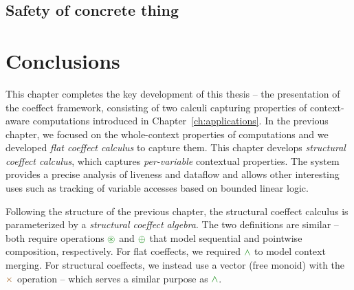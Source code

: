 
\subsection{Safety of concrete thing}
\label{sec:struct-transl-safety}

\newpage


%
%


\section{Conclusions}

This chapter completes the key development of this thesis -- the presentation of the coeffect
framework, consisting of two calculi capturing properties of context-aware computations introduced
in Chapter~\ref{ch:applications}. In the previous chapter, we focused on the whole-context
properties of computations and we developed \emph{flat coeffect calculus} to capture them.
This chapter develops \emph{structural coeffect calculus}, which captures \emph{per-variable}
contextual properties. The system provides a precise analysis of liveness and dataflow and allows
other interesting uses such as tracking of variable accesses based on bounded linear logic.

Following the structure of the previous chapter, the structural coeffect calculus is parameterized
by a \emph{structural coeffect algebra}. The two definitions are similar -- both require operations
$\cseq$ and $\cpar$ that model sequential and pointwise composition, respectively. For flat
coeffects, we required $\czip$ to model context merging. For structural coeffects, we
instead use a vector (free monoid) with the $\atimes$ operation -- which serves a similar purpose
as $\czip$.

